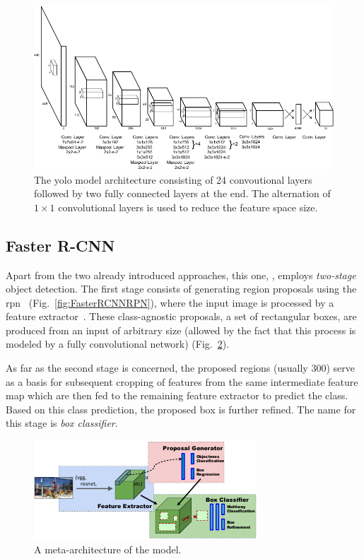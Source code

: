 \begin{figure}[t]
    \centerline{\includegraphics[width=0.8\linewidth]{figures/theoretical_foundations/yolo_architecture.pdf}}
    \caption[\Gls{yolo} architecture]{The \gls{yolo} model architecture consisting of 24 convoutional layers followed by two fully connected layers at the end. The alternation of $1 \times 1$ convolutional layers is used to reduce the feature space size. }
    \label{fig:YOLOArchitecture}
\end{figure}

\subsection{Faster R-CNN}
\label{ssec:FasterRCNN}

Apart from the two already introduced approaches, this one, , employs \emph{two-stage} object detection. The first stage consists of generating region proposals using the \gls{rpn}~\cite{Ren2017} (Fig.~\ref{fig:FasterRCNNRPN}), where the input image is processed by a feature extractor~\cite{Huang2017}. These class-agnostic proposals, a set of rectangular boxes, are produced from an input of arbitrary size (allowed by the fact that this process is modeled by a fully convolutional network) (Fig.~\ref{fig:FasterRCNNMetaArch}).

As far as the second stage is concerned, the proposed regions (usually $300$) serve as a basis for subsequent cropping of features from the same intermediate feature map which are then fed to the remaining feature extractor to predict the class. Based on this class prediction, the proposed box is further refined. The name for this stage is \emph{box classifier}.

\begin{figure}[t]
    \centerline{\includegraphics[width=0.7\linewidth]{figures/theoretical_foundations/faster_rcnn_metaarchitecture.pdf}}
    \caption[ meta-architecture]{A meta-architecture of the  model. }
    \label{fig:FasterRCNNMetaArch}
\end{figure}

